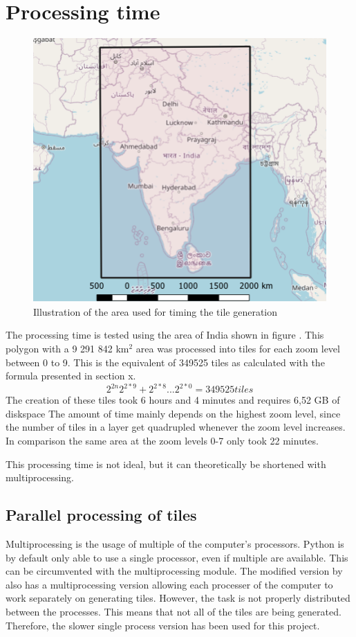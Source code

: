 \section{Processing time}\label{TilesTime}

\begin{figure} [H]
	\centering
	\includegraphics[width=.6\textwidth]{Pictures/ProcessingTime}
	\caption{Illustration of the area used for timing the tile generation}
	\label{ProcessingTime}
\end{figure}

The processing time is tested using the area of India shown in figure \citep{ProcessingTime}. This polygon with a 9 291 842 km$^2$ area was processed into tiles for each zoom level between 0 to 9. This is the equivalent of 349525 tiles as calculated with the formula presented in section x. 
\begin{equation}
2^{2n}
2^{2*9}+2^{2*8} .. . 2^{2*0} = 349525 tiles
\end{equation}
The creation of these tiles took 6 hours and 4 minutes and requires 6,52 GB of diskspace The amount of time mainly depends on the highest zoom level, since the number of tiles in a layer get quadrupled whenever the zoom level increases. In comparison the same area at the zoom levels 0-7 only took 22 minutes.

This processing time is not ideal, but it can theoretically be shortened with multiprocessing.
\subsection{Parallel processing of tiles}
Multiprocessing is the usage of multiple of the computer’s processors. Python is by default only able to use a single processor, even if multiple are available.  This can be circumvented with the multiprocessing module.
\citep{Multiprocessing}
The modified version by \citet{gdalLeaflet} also has a multiprocessing version allowing each processer of the computer to work separately on generating tiles. However, the task is not properly distributed between the processes. This means that not all of the tiles are being generated. 
\citep{NoMulti}
Therefore, the slower single process version has been used for this project.


